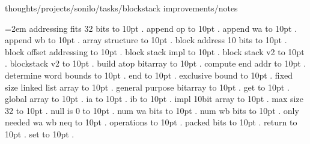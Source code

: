 \bigskip
{}
thoughts/projects/sonilo/tasks/blockstack improvements/notes
\par\begingroup
\leftskip=2em
\smallskip
\medskip
addressing fits 32 bits \leaders\hbox to 10pt {\hss.\hss}  \hfill {}
\smallskip
append op \leaders\hbox to 10pt {\hss.\hss}  \hfill {}
\smallskip
append wa \leaders\hbox to 10pt {\hss.\hss}  \hfill {}
\smallskip
append wb \leaders\hbox to 10pt {\hss.\hss}  \hfill {}
\smallskip
array structure \leaders\hbox to 10pt {\hss.\hss}  \hfill {}
\smallskip
block address 10 bits \leaders\hbox to 10pt {\hss.\hss}  \hfill {}
\smallskip
block offset addressing \leaders\hbox to 10pt {\hss.\hss}  \hfill {}
\smallskip
block stack impl \leaders\hbox to 10pt {\hss.\hss}  \hfill {}
\smallskip
block stack v2 \leaders\hbox to 10pt {\hss.\hss}  \hfill {}
\smallskip
blockstack v2 \leaders\hbox to 10pt {\hss.\hss}  \hfill {}
\smallskip
build atop bitarray \leaders\hbox to 10pt {\hss.\hss}  \hfill {}
\smallskip
compute end addr \leaders\hbox to 10pt {\hss.\hss}  \hfill {}
\smallskip
determine word bounds \leaders\hbox to 10pt {\hss.\hss}  \hfill {}
\smallskip
end \leaders\hbox to 10pt {\hss.\hss}  \hfill {}
\smallskip
exclusive bound \leaders\hbox to 10pt {\hss.\hss}  \hfill {}
\smallskip
fixed size linked list array \leaders\hbox to 10pt {\hss.\hss}  \hfill {}
\smallskip
general purpose bitarray \leaders\hbox to 10pt {\hss.\hss}  \hfill {}
\smallskip
get \leaders\hbox to 10pt {\hss.\hss}  \hfill {}
\smallskip
global array \leaders\hbox to 10pt {\hss.\hss}  \hfill {}
\smallskip
ia \leaders\hbox to 10pt {\hss.\hss}  \hfill {}
\smallskip
ib \leaders\hbox to 10pt {\hss.\hss}  \hfill {}
\smallskip
impl 10bit array \leaders\hbox to 10pt {\hss.\hss}  \hfill {}
\smallskip
max size 32 \leaders\hbox to 10pt {\hss.\hss}  \hfill {}
\smallskip
null is 0 \leaders\hbox to 10pt {\hss.\hss}  \hfill {}
\smallskip
num wa bits \leaders\hbox to 10pt {\hss.\hss}  \hfill {}
\smallskip
num wb bits \leaders\hbox to 10pt {\hss.\hss}  \hfill {}
\smallskip
only needed wa wb neq \leaders\hbox to 10pt {\hss.\hss}  \hfill {}
\smallskip
operations \leaders\hbox to 10pt {\hss.\hss}  \hfill {}
\smallskip
packed bits \leaders\hbox to 10pt {\hss.\hss}  \hfill {}
\smallskip
return \leaders\hbox to 10pt {\hss.\hss}  \hfill {}
\smallskip
set \leaders\hbox to 10pt {\hss.\hss}  \hfill {}
